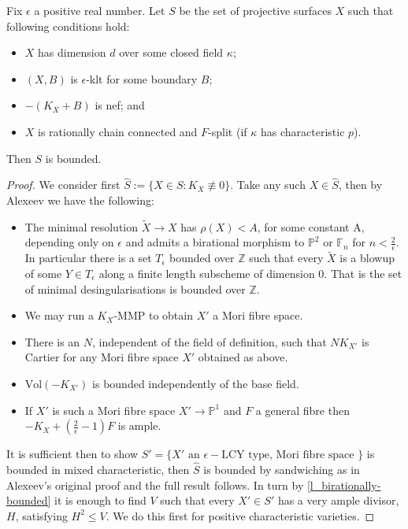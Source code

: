 \documentclass[a4paper,12pt]{book}
\newcommand{\Vol}{\text{Vol}}
\begin{document}
\begin{theorem}\label{SBAB}
	Fix $\epsilon$ a positive real number. Let $S$ be the set of projective surfaces $X$ such that following conditions hold:
	\begin{itemize}
		\item $X$ has dimension $d$ over some closed field $\kappa$;
		\item $(X,B)$ is $\epsilon$-klt for some boundary $B$;
		\item $-(K_{X}+B)$ is nef; and
		\item $X$ is rationally chain connected and $F$-split (if $\kappa$ has characteristic $p$).
	\end{itemize}
	Then $S$ is bounded.
\end{theorem}
\begin{proof}
	We consider first $\hat{S}:=\{X \in S\colon  K_{X} \not\equiv 0\}$. Take any such $X \in \hat{S}$, then by Alexeev \cite[Chapter 6]{alexeev1994boundedness} we have the following:
	\begin{itemize}
		\item The minimal resolution $\tilde{X}\to X$ has $\rho(X) < A $, for some constant A, depending only on $\epsilon$ and admits a birational morphism to $\mathbb{P}^{2}$ or $\mathbb{F}_{n}$ for $n < \frac{2}{\epsilon}$. In particular there is a set $T_{\epsilon}$ bounded over $\mathbb{Z}$ such that every $\tilde{X}$ is a blowup of some $Y \in T_{\epsilon}$ along a finite length subscheme of dimension $0$. That is the set of minimal desingularisations is bounded over $\mathbb{Z}$.
		\item We may run a $K_{X}$-MMP to obtain $X'$ a Mori fibre space. 
		\item There is an $N$, independent of the field of definition, such that $NK_{X'}$ is Cartier for any Mori fibre space $X'$ obtained as above.
		\item $\Vol(-K_{X'})$ is bounded independently of the base field.
		\item If $X'$ is such a Mori fibre space $X' \to \mathbb{P}^{1}$ and $F$ a general fibre then $-K_{X} +(\frac{2}{\epsilon}-1)F$ is ample.
	\end{itemize}
	
	It is sufficient then to show $S'=\{X' \text{ an } \epsilon-\text{LCY type, Mori fibre space }\}$ is bounded in mixed characteristic, then $\hat{S}$ is bounded by sandwiching as in Alexeev's original proof and the full result follows. In turn by \autoref{l_birationally-bounded} it is enough to find $V$ such that every $X' \in S'$ has a very ample divisor, $H$, satisfying $H^{2}\leq V$. We do this first for positive characteristic varieties.
	

\end{proof}
\end{document}
